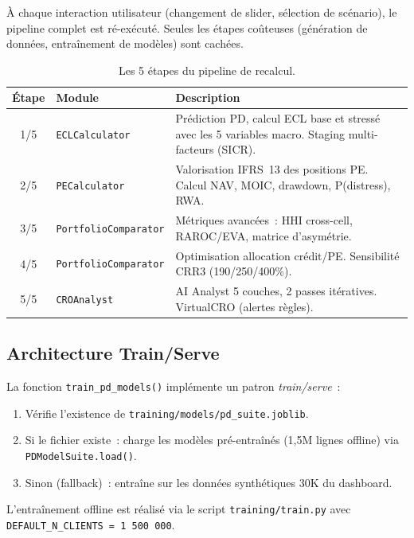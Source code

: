 \documentclass[12pt,a4paper]{article}
\begin{document}
\`A chaque interaction utilisateur (changement de slider, s\'election de sc\'enario), le pipeline complet est r\'e-ex\'ecut\'e. Seules les \'etapes co\^uteuses (g\'en\'eration de donn\'ees, entra\^{i}nement de mod\`eles) sont cach\'ees.

\begin{table}[ht]
\centering
\caption{Les 5 \'etapes du pipeline de recalcul.}
\label{tab:pipeline}
\small
\begin{tabular}{@{}clp{7.5cm}@{}}
\toprule
\textbf{\'Etape} & \textbf{Module} & \textbf{Description} \\
\midrule
1/5 & \texttt{ECLCalculator} & Pr\'ediction PD, calcul ECL base et stress\'e avec les 5 variables macro. Staging multi-facteurs (SICR). \\
2/5 & \texttt{PECalculator} & Valorisation IFRS~13 des positions PE. Calcul NAV, MOIC, drawdown, P(distress), RWA. \\
3/5 & \texttt{PortfolioComparator} & M\'etriques avanc\'ees~: HHI cross-cell, RAROC/EVA, matrice d'asym\'etrie. \\
4/5 & \texttt{PortfolioComparator} & Optimisation allocation cr\'edit/PE. Sensibilit\'e CRR3 (190/250/400\%). \\
5/5 & \texttt{CROAnalyst} & AI Analyst 5 couches, 2 passes it\'eratives. VirtualCRO (alertes r\`egles). \\
\bottomrule
\end{tabular}
\end{table}

\subsection{Architecture Train/Serve}

\begin{definitionbox}
La fonction \texttt{train\_pd\_models()} impl\'emente un patron \emph{train/serve}~:
\begin{enumerate}[leftmargin=1em]
    \item V\'erifie l'existence de \texttt{training/models/pd\_suite.joblib}.
    \item Si le fichier existe~: charge les mod\`eles pr\'e-entra\^{i}n\'es (1,5M lignes offline) via \texttt{PDModelSuite.load()}.
    \item Sinon (fallback)~: entra\^{i}ne sur les donn\'ees synth\'etiques 30K du dashboard.
\end{enumerate}
L'entra\^{i}nement offline est r\'ealis\'e via le script \texttt{training/train.py} avec \texttt{DEFAULT\_N\_CLIENTS = 1\,500\,000}.
\end{definitionbox}
\end{document}
